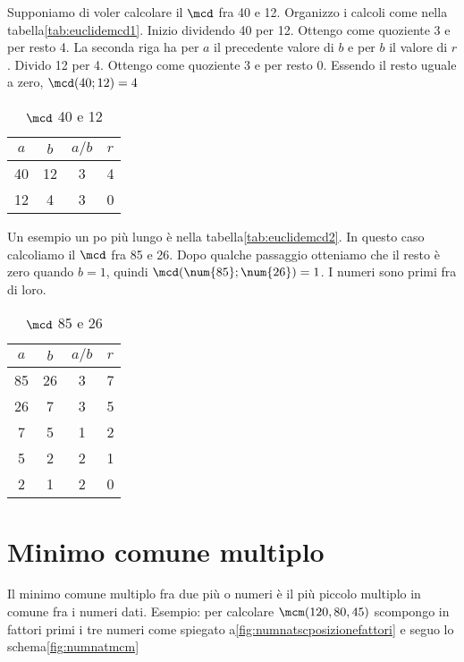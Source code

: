    Supponiamo di voler calcolare il $\mcd$ fra \num{40} e \num{12}. Organizzo i calcoli come nella tabella\nobs\vref*{tab:euclidemcd1}. Inizio dividendo \num{40} per \num{12}. Ottengo come quoziente  \num{3} e per resto  \num{4}. La seconda riga ha per $a$ il precedente valore di $b$ e per $b$ il valore di $r$. Divido  \num{12} per \num{4}. Ottengo come quoziente  \num{3} e per resto  \num{0}. Essendo il resto uguale a zero, $\mcd(40;12)=4$
   \begin{table}
   	\centering
   	\begin{tabular}{SSSS}
   		\toprule
   		$a$&$b$&$a/b$&$r$\\
   		&12&3&4\\
   		12&4&3&0\\
   		\bottomrule
   	\end{tabular}
   	\caption[]{$\mcd$ \num{40} e \num{12}}
   	\label{tab:euclidemcd1}
   	\end{table} 
   	
   	Un esempio un po più lungo è nella tabella\nobs\vref*{tab:euclidemcd2}. In questo caso calcoliamo il $\mcd$ fra \num{85} e \num{26}. Dopo qualche passaggio otteniamo che il resto è zero quando $b=1$, quindi $\mcd(\num{85};\num{26})=1$. I numeri sono primi fra di loro. 
   	\begin{table}
   		\centering
   		\begin{tabular}{SSSS}
   			\toprule
   			$a$&$b$&$a/b$&$r$\\
   			&26&3&7\\
   			26&7&3&5\\
   			7&5&1&2\\
   			5&2&2&1\\
   			2&1&2&0\\
   			\bottomrule
   		\end{tabular}
   		\caption[]{$\mcd$ \num{85} e \num{26}}
   		\label{tab:euclidemcd2}
   	\end{table} 
    \section{Minimo comune multiplo}
        	\label{sec:mcmnumerinaturali}
     Il minimo comune multiplo fra due più o numeri è il più piccolo multiplo  in comune fra i numeri dati. 
    Esempio: per calcolare $\mcm(120,80,45)$ scompongo in fattori  primi i tre numeri come spiegato a\nobs\vref{fig:numnatscposizionefattori} e seguo lo schema\nobs\vref{fig:numnatmcm}     	
    	
